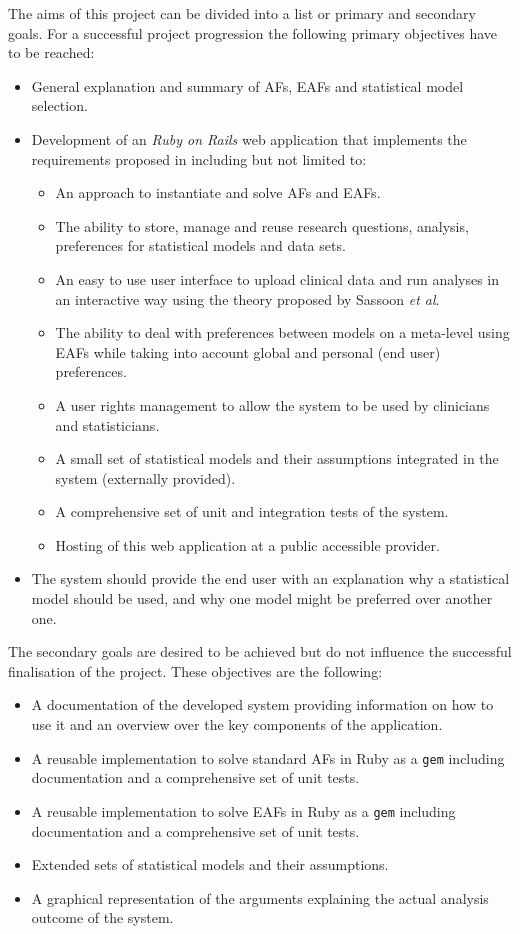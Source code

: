 The aims of this project can be divided into a list or primary and secondary goals. For a successful project progression the following primary objectives have to be reached:
\begin{itemize}
	\item General explanation and summary of \glspl{AF}, \glspl{EAF} and statistical model selection.
	\item Development of an \textit{Ruby on Rails} web application that implements the requirements proposed in \cite{sassoon2014} including but not limited to:
	\begin{itemize}
		\item An approach to instantiate and solve \glspl{AF} and \glspl{EAF}.
		\item The ability to store, manage and reuse research questions, analysis, preferences for statistical models and data sets.
		\item An easy to use user interface to upload clinical data and run analyses in an interactive way using the theory proposed by Sassoon \textit{et al}.
		\item The ability to deal with preferences between models on a meta-level using \glspl{EAF} while taking into account global and personal (end user) preferences.
		\item A user rights management to allow the system to be used by clinicians and statisticians.
		\item A small set of statistical models and their assumptions integrated in the system (externally provided).
		\item A comprehensive set of unit and integration tests of the system.
		\item Hosting of this web application at a public accessible provider.
	\end{itemize}	
	\item The system should provide the end user with an explanation why a statistical model should be used, and why one model might be preferred over another one.
\end{itemize}


The secondary goals are desired to be achieved but do not influence the successful finalisation of the project. These objectives are the following:
\begin{itemize}
	\item A documentation of the developed system providing information on how to use it and an overview over the key components of the application.
	\item A reusable implementation to solve standard \glspl{AF} in Ruby as a \texttt{gem} including documentation and a comprehensive set of unit tests.
	\item A reusable implementation to solve \glspl{EAF} in Ruby as a \texttt{gem} including documentation and a comprehensive set of unit tests.
	\item Extended sets of statistical models and their assumptions.
	\item A graphical representation of the arguments explaining the actual analysis outcome of the system.
\end{itemize}


